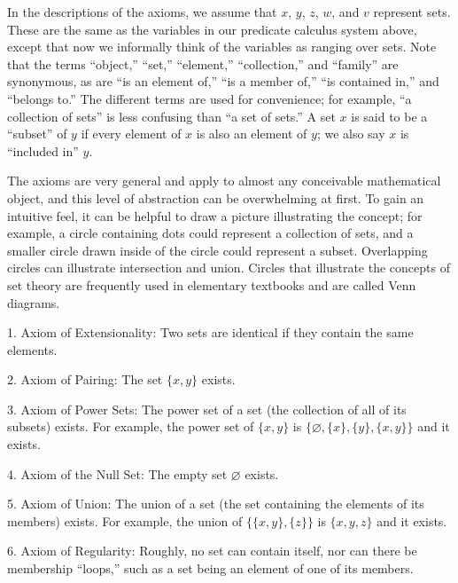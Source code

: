 In the descriptions of the axioms, we assume that $x$, $y$, $z$, $w$, and $v$
represent sets.  These are the same as the variables in our predicate calculus system above, except that now we informally
think of the variables as ranging over sets.  Note that the terms
``object,'' ``set,'' ``element,''
``collection,'' and ``family'' are synonymous,
as are ``is an element of,'' ``is a member of,'' ``is contained
in,'' and ``belongs to.''  The different terms are used for convenience; for
example, ``a collection of sets'' is less confusing than ``a set of sets.''
A set $x$ is said to be a ``subset'' of $y$ if every element of
$x$ is also an element of $y$; we also say $x$ is ``included in''
$y$.

The axioms are very general and apply to almost any conceivable mathematical
object, and this level of abstraction can be overwhelming at first.  To gain an
intuitive feel, it can be helpful to draw a picture illustrating the concept;
for example, a circle containing dots could represent a collection of sets,
and a smaller circle drawn inside of the circle could represent a subset.
Overlapping circles can illustrate intersection and union.  Circles that
illustrate the concepts of set theory are frequently used in elementary
textbooks and are called Venn diagrams.

1. Axiom of Extensionality:  Two sets are identical if they contain the same
   elements.

2. Axiom of Pairing:  The set $\{ x , y \}$ exists.

3. Axiom of Power Sets:  The power set of a set (the collection of all of
   its subsets) exists.  For example, the power set of $\{x,y\}$ is
   $\{\varnothing,\{x\},\{y\},\{x,y\}\}$ and it exists.

4. Axiom of the Null Set:  The empty set $\varnothing$ exists.

5. Axiom of Union:  The union of a set (the set containing the elements of
   its members) exists.  For example, the union of $\{\{x,y\},\{z\}\}$ is
 $\{x,y,z\}$ and
   it exists.

6. Axiom of Regularity:  Roughly, no set can contain itself, nor can there
   be membership ``loops,'' such as a set being an
   element of one of its members.

